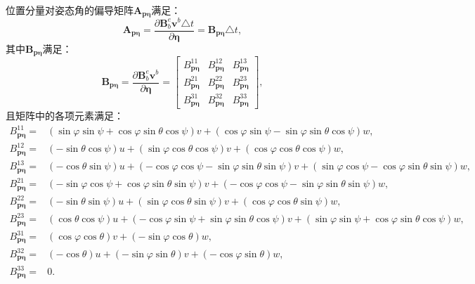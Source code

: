位置分量对姿态角的偏导矩阵$\boldsymbol{A}_{\boldsymbol{p\eta}}$满足：
\begin{equation}
    \boldsymbol{A}_{\boldsymbol{p\eta}} = \frac{\partial \boldsymbol{B}_b^e \boldsymbol{v}^b \triangle t}{\partial \boldsymbol{\eta}} = \boldsymbol{B}_{\boldsymbol{p \eta}}\triangle t,
\end{equation}
其中$\boldsymbol{B}_{\boldsymbol{p \eta}}$满足：
\begin{equation}
    \boldsymbol{B}_{\boldsymbol{p \eta}} = \frac{\partial \boldsymbol{B}_b^e \boldsymbol{v}^b}{\partial \boldsymbol{\eta}} = 
    \begin{bmatrix}
        B_{\boldsymbol{p \eta}}^{11} & B_{\boldsymbol{p \eta}}^{12} & B_{\boldsymbol{p \eta}}^{13} \\
        B_{\boldsymbol{p \eta}}^{21} & B_{\boldsymbol{p \eta}}^{22} & B_{\boldsymbol{p \eta}}^{23} \\
        B_{\boldsymbol{p \eta}}^{31} & B_{\boldsymbol{p \eta}}^{32} & B_{\boldsymbol{p \eta}}^{33}
    \end{bmatrix},
\end{equation}
且矩阵中的各项元素满足：
\begin{equation}
    \begin{aligned}
        B_{\boldsymbol{p \eta}}^{11} =& (\sin\varphi \sin\psi + \cos\varphi \sin\theta \cos\psi)v + (\cos\varphi \sin\psi - \sin\varphi \sin\theta \cos\psi)w, \\
        B_{\boldsymbol{p \eta}}^{12} =& (-\sin\theta \cos\psi)u + (\sin\varphi \cos\theta \cos\psi)v + (\cos\varphi \cos\theta \cos\psi)w, \\
        B_{\boldsymbol{p \eta}}^{13} =& (-\cos\theta \sin\psi)u + (-\cos\varphi \cos\psi - \sin\varphi \sin\theta \sin\psi)v + (\sin\varphi \cos\psi - \cos\varphi \sin\theta \sin\psi)w, \\
        B_{\boldsymbol{p \eta}}^{21} =& (-\sin\varphi \cos\psi + \cos\varphi \sin\theta \sin\psi)v + (-\cos\varphi \cos\psi - \sin\varphi \sin\theta \sin\psi)w, \\
        B_{\boldsymbol{p \eta}}^{22} =& (-\sin\theta \sin\psi)u + (\sin\varphi \cos\theta \sin\psi)v + (\cos\varphi \cos\theta \sin\psi)w, \\
        B_{\boldsymbol{p \eta}}^{23} =& (\cos\theta \cos\psi)u + (-\cos\varphi \sin\psi + \sin\varphi \sin\theta \cos\psi)v + (\sin\varphi \sin\psi + \cos\varphi \sin\theta \cos\psi)w, \\
        B_{\boldsymbol{p \eta}}^{31} =& (\cos\varphi \cos\theta)v + (-\sin\varphi \cos\theta)w, \\
        B_{\boldsymbol{p \eta}}^{32} =& (-\cos\theta)u + (-\sin\varphi \sin\theta)v + (-\cos\varphi \sin\theta)w, \\
        B_{\boldsymbol{p \eta}}^{33} =& 0.
    \end{aligned}
\end{equation}


